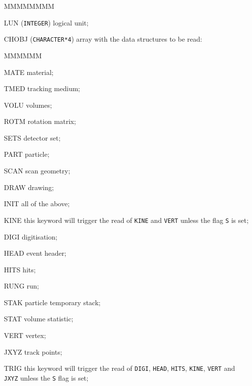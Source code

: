        
       
\begin{DLtt}{MMMMMMMM}
\item[LUN] ({\tt INTEGER}) logical unit;
\item[CHOBJ] ({\tt CHARACTER*4}) array with the data structures to be read:
\begin{DLtt}{MMMMMM}
\item[MATE] material;
\item[TMED] tracking medium;
\item[VOLU] volumes;
\item[ROTM] rotation matrix;
\item[SETS] detector set;
\item[PART] particle;
\item[SCAN] scan geometry;
\item[DRAW] drawing;
\item[INIT] all of the above;
\item[KINE] this keyword will trigger the read of {\tt KINE} and {\tt VERT}
unless the flag {\tt S} is set;
\item[DIGI] digitisation;
\item[HEAD] event header;
\item[HITS] hits;
\item[RUNG] run;
\item[STAK] particle temporary stack;
\item[STAT] volume statistic;
\item[VERT] vertex;
\item[JXYZ] track points;
\item[TRIG] this keyword will trigger the read of
{\tt DIGI}, {\tt HEAD}, {\tt HITS}, {\tt KINE}, {\tt VERT} and {\tt JXYZ}
unless the {\tt S} flag is set;
\end{DLtt}

\end{DLtt}
